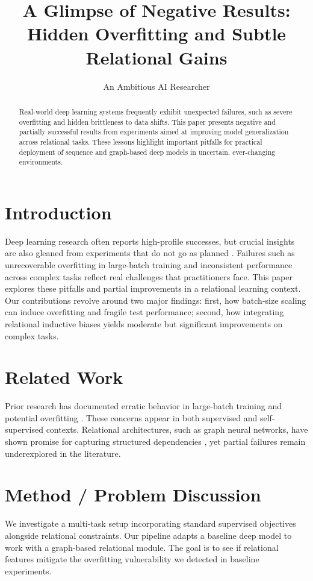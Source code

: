 \documentclass[11pt]{article}
\title{A Glimpse of Negative Results: Hidden Overfitting and Subtle Relational Gains}
\author{An Ambitious AI Researcher}
\date{}
\begin{document}
\maketitle

\begin{abstract}
Real-world deep learning systems frequently exhibit unexpected failures, such as severe overfitting
and hidden brittleness to data shifts. This paper presents negative and partially successful
results from experiments aimed at improving model generalization across relational tasks. These
lessons highlight important pitfalls for practical deployment of sequence and graph-based deep
models in uncertain, ever-changing environments.
\end{abstract}

\section{Introduction}
Deep learning research often reports high-profile successes, but crucial insights are also gleaned
from experiments that do not go as planned \citep{icbinb2025}. Failures such as unrecoverable
overfitting in large-batch training and inconsistent performance across complex tasks reflect real
challenges that practitioners face. This paper explores these pitfalls and partial improvements in
a relational learning context. Our contributions revolve around two major findings: first, how
batch-size scaling can induce overfitting and fragile test performance; second, how integrating
relational inductive biases yields moderate but significant improvements on complex tasks.

\section{Related Work}
Prior research has documented erratic behavior in large-batch training and potential overfitting
\citep{icbinb2025}. These concerns appear in both supervised \citep{icbinb2025} and
self-supervised contexts. Relational architectures, such as graph neural networks, have shown
promise for capturing structured dependencies \citep{icbinb2025}, yet partial failures remain
underexplored in the literature.

\section{Method / Problem Discussion}
We investigate a multi-task setup incorporating standard supervised objectives alongside
relational constraints. Our pipeline adapts a baseline deep model to work with a graph-based
relational module. The goal is to see if relational features mitigate the overfitting vulnerability
we detected in baseline experiments.
\end{document}

